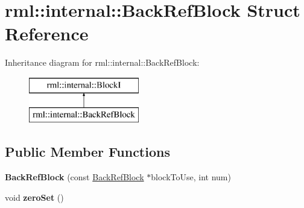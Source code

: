 \hypertarget{structrml_1_1internal_1_1BackRefBlock}{}\section{rml\+:\+:internal\+:\+:Back\+Ref\+Block Struct Reference}
\label{structrml_1_1internal_1_1BackRefBlock}
Inheritance diagram for rml\+:\+:internal\+:\+:Back\+Ref\+Block\+:\begin{figure}[H]
\begin{center}
\leavevmode
\includegraphics[height=2.000000cm]{structrml_1_1internal_1_1BackRefBlock}
\end{center}
\end{figure}
\subsection*{Public Member Functions}
\begin{DoxyCompactItemize}
\item 
\hypertarget{structrml_1_1internal_1_1BackRefBlock_a6bb97a3727a64e2d9317b1ad9d495792}{}{\bfseries Back\+Ref\+Block} (const \hyperlink{structrml_1_1internal_1_1BackRefBlock}{Back\+Ref\+Block} $\ast$block\+To\+Use, int num)\label{structrml_1_1internal_1_1BackRefBlock_a6bb97a3727a64e2d9317b1ad9d495792}

\item 
\hypertarget{structrml_1_1internal_1_1BackRefBlock_a5ead9463c799a7dd21ce45a45df08972}{}void {\bfseries zero\+Set} ()\label{structrml_1_1internal_1_1BackRefBlock_a5ead9463c799a7dd21ce45a45df08972}

\end{DoxyCompactItemize}
